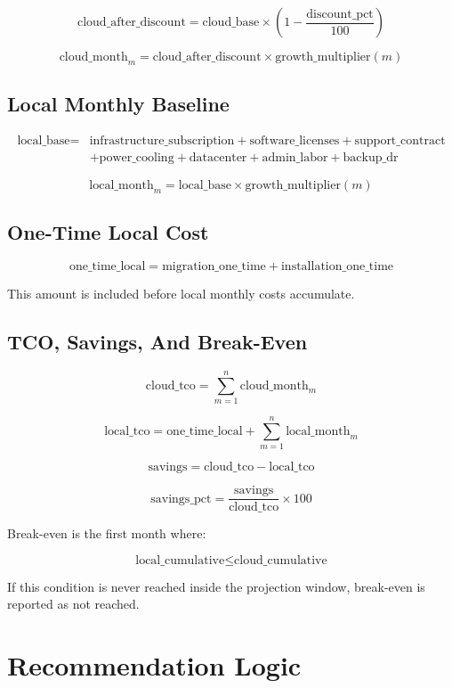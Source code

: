 \documentclass[11pt,a4paper]{article}
\begin{document}
\[
\text{cloud\_after\_discount} = \text{cloud\_base} \times \left(1 - \frac{\text{discount\_pct}}{100}\right)
\]

\[
\text{cloud\_month}_m = \text{cloud\_after\_discount} \times \text{growth\_multiplier}(m)
\]

\subsection{Local Monthly Baseline}

\[
\begin{aligned}
\text{local\_base} ={}& \text{infrastructure\_subscription} + \text{software\_licenses} + \text{support\_contract} \\
& + \text{power\_cooling} + \text{datacenter} + \text{admin\_labor} + \text{backup\_dr}
\end{aligned}
\]

\[
\text{local\_month}_m = \text{local\_base} \times \text{growth\_multiplier}(m)
\]

\subsection{One-Time Local Cost}

\[
\text{one\_time\_local} = \text{migration\_one\_time} + \text{installation\_one\_time}
\]

This amount is included before local monthly costs accumulate.

\subsection{TCO, Savings, And Break-Even}

\[
\text{cloud\_tco} = \sum_{m=1}^{n} \text{cloud\_month}_m
\]

\[
\text{local\_tco} = \text{one\_time\_local} + \sum_{m=1}^{n} \text{local\_month}_m
\]

\[
\text{savings} = \text{cloud\_tco} - \text{local\_tco}
\]

\[
\text{savings\_pct} = \frac{\text{savings}}{\text{cloud\_tco}} \times 100
\]

Break-even is the first month where:

\[
\text{local\_cumulative} \leq \text{cloud\_cumulative}
\]

If this condition is never reached inside the projection window, break-even is reported as not reached.

\section{Recommendation Logic}
\end{document}
